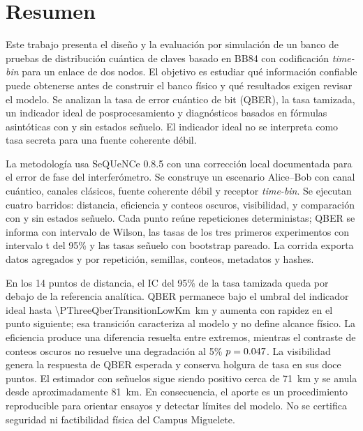 \chapter*{Resumen}
{}

Este trabajo presenta el diseño y la evaluación por simulación de un banco de pruebas de distribución cuántica de claves basado en BB84 con codificación \textit{time-bin} para un enlace de dos nodos. El objetivo es estudiar qué información confiable puede obtenerse antes de construir el banco físico y qué resultados exigen revisar el modelo. Se analizan la tasa de error cuántico de bit (QBER), la tasa tamizada, un indicador ideal de posprocesamiento y diagnósticos basados en fórmulas asintóticas con y sin estados señuelo. El indicador ideal no se interpreta como tasa secreta para una fuente coherente débil.

La metodología usa SeQUeNCe 0.8.5 con una corrección local documentada para el error de fase del interferómetro. Se construye un escenario Alice--Bob con canal cuántico, canales clásicos, fuente coherente débil y receptor \textit{time-bin}. Se ejecutan cuatro barridos: distancia, eficiencia y conteos oscuros, visibilidad, y comparación con y sin estados señuelo. Cada punto reúne \PThreeRepetitions{} repeticiones deterministas; QBER se informa con intervalo de Wilson, las tasas de los tres primeros experimentos con intervalo t del 95\% y las tasas señuelo con bootstrap pareado. La corrida exporta datos agregados y por repetición, semillas, conteos, metadatos y hashes.

En los 14 puntos de distancia, el IC del 95\% de la tasa tamizada queda por debajo de la referencia analítica. QBER permanece bajo el umbral del indicador ideal hasta \SI[round-mode=places,round-precision=2]{\PThreeQberTransitionLowKm}{\kilo\meter} y aumenta con rapidez en el punto siguiente; esa transición caracteriza al modelo y no define alcance físico. La eficiencia produce una diferencia resuelta entre extremos, mientras el contraste de conteos oscuros no resuelve una degradación al 5\% \(p=\num[round-mode=places,round-precision=3]{\PThreeDarkPValue}\). La visibilidad genera la respuesta de QBER esperada y conserva holgura de tasa en sus doce puntos. El estimador con señuelos sigue siendo positivo cerca de \SI{71}{\kilo\meter} y se anula desde aproximadamente \SI{81}{\kilo\meter}. En consecuencia, el aporte es un procedimiento reproducible para orientar ensayos y detectar límites del modelo. No se certifica seguridad ni factibilidad física del Campus Miguelete.

